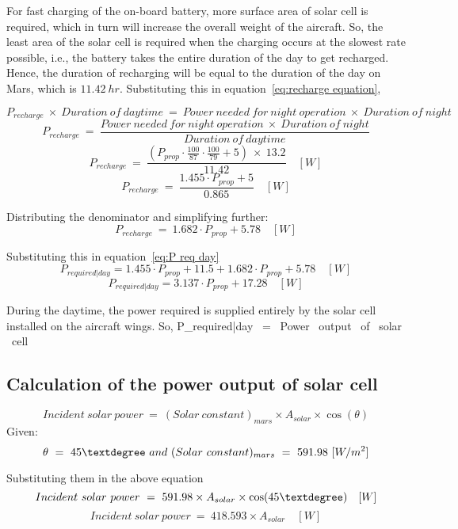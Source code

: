 \p For fast charging of the on-board battery, more surface area of solar cell is required, which in turn will increase the overall weight of the aircraft. So, the least area of the solar cell is required when the charging occurs at the slowest rate possible, i.e., the battery takes the entire duration of the day to get recharged. Hence, the duration of recharging will be equal to the duration of the day on Mars, which is $ 11.42 \ hr $. Substituting this in equation~\ref{eq:recharge equation},

\[ P_{recharge} \ \times \ Duration \ of \ daytime \ = \ Power \ needed \ for \ night \ operation \ \times \ Duration \ of \ night \]
\[ P_{recharge} \ = \ \frac{ Power \ needed \ for \ night \ operation \ \times \ Duration \ of \ night }{ Duration \ of \ daytime } \]
\[ P_{recharge} \ = \ \frac{ \left(P_{prop} \cdot \frac{100}{87} \cdot \frac{100}{79} + 5 \right) \ \times \ 13.2 }{ 11.42 } \quad [W] \]
\[ P_{recharge} \ = \ \frac{ 1.455 \cdot P_{prop} + 5 }{ 0.865 } \quad [W] \]

Distributing the denominator and simplifying further:
\[ P_{recharge} \ = \ 1.682 \cdot P_{prop} + 5.78 \quad [W] \]

Substituting this in equation~\ref{eq:P req day}
\[ P_{required|day} = 1.455 \cdot P_{prop} + 11.5 + 1.682 \cdot P_{prop} + 5.78 \quad [W] \]
\[ P_{required|day} = 3.137 \cdot P_{prop} + 17.28 \quad [W] \]

\p During the daytime, the power required is supplied entirely by the solar cell installed on the aircraft wings. So,
\] P_{required|day} \ = \ Power \ output \ of \ solar \ cell \]

\subsection{Calculation of the power output of solar cell}

\[ Incident \ solar \ power \ = \ (Solar\ constant)_{mars} \times A_{solar} \times \cos(\theta) \]
Given:
\[ \theta \ = \ 45 \textdegree \ and \  (Solar\ constant)_{mars} \ = \ 591.98 \ [W/m^2] \]

Substituting them in the above equation
\[ Incident \ solar \ power \ = \ 591.98 \times A_{solar} \times \cos(45\textdegree) \quad [W] \]
\[ Incident \ solar \ power \ = \ 418.593 \times A_{solar} \quad [W] \]

